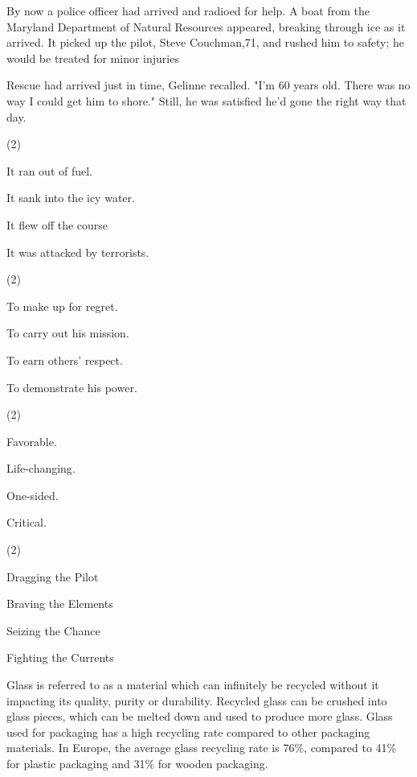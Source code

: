 \documentclass{英语试卷}
\begin{document}
\par By now a police officer had arrived and radioed for help. A boat from the Maryland Department of Natural Resources appeared, breaking through ice as it arrived. It picked up the pilot, Steve Couchman,71, and rushed him to safety; he would be treated for minor injuries\par
\par Rescue had arrived just in time, Gelinne recalled. "I'm 60 years old. There was no way I could get him to shore." Still, he was satisfied he'd gone the right way that day.\par
{}
\begin{choices}(2)
  \item It ran out of fuel.
  \item It sank into the icy water.
  \item It flew off the course
  \item It was attacked by terrorists.
\end{choices}
\begin{choices}(2)
  \item To make up for regret.
  \item To carry out his mission.
  \item To earn others' respect.
  \item To demonstrate his power.
\end{choices}
\begin{choices}(2)
  \item Favorable.
  \item Life-changing.
  \item One-sided.
  \item Critical.
\end{choices}
\begin{choices}(2)
  \item Dragging the Pilot
  \item Braving the Elements
  \item Seizing the Chance
  \item Fighting the Currents
\end{choices}
\par Glass is referred to as a material which can infinitely be recycled without it impacting its quality, purity or durability. Recycled glass can be crushed into glass pieces, which can be melted down and used to produce more glass. Glass used for packaging has a high recycling rate compared to other packaging materials. In Europe, the average glass recycling rate is 76\%, compared to 41\% for plastic packaging and 31\% for wooden packaging.\par
\end{document}

